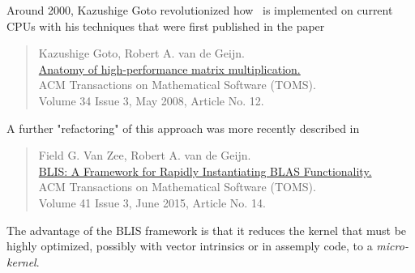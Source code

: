 Around 2000, Kazushige Goto revolutionized how \Gemm\ is implemented on current CPUs with his techniques
that were first published in the paper~\cite{Goto:2008:AHP}
\begin{quote}
	Kazushige Goto, Robert A. van de Geijn.\\
	\href{http://dl.acm.org/citation.cfm?id=1356052.1356053&coll=DL&dl=GUIDE&CFID=71223967&CFTOKEN=96440140}{Anatomy of high-performance matrix multiplication.}\\
	ACM Transactions on Mathematical Software (TOMS).\\
	Volume 34 Issue 3, May 2008, Article No. 12.
\end{quote}
A further "refactoring" of this approach was more recently described in~\cite{BLIS1} 
\begin{quote}
	Field G. Van Zee, Robert A. van de Geijn. \\
	\href{http://dl.acm.org/citation.cfm?id=2786970.2764454&coll=DL&dl=GUIDE&CFID=702354034&CFTOKEN=48470379}{%
		BLIS: A Framework for Rapidly Instantiating BLAS Functionality.} \\
	ACM Transactions on Mathematical Software (TOMS).\\
	Volume 41 Issue 3, June 2015,
	Article No. 14.
\end{quote}
The advantage of the BLIS framework is that it reduces the kernel that must be highly optimized, possibly with vector intrinsics or in assemply code, to a {\em micro-kernel}. 

